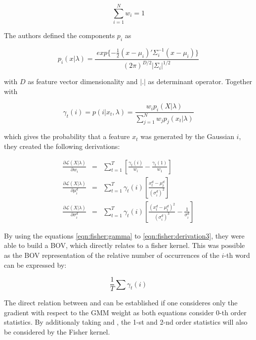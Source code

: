 \begin{equation}
\sum_{i=1}^{N} w_i = 1
\label{eqn:fisher_weights}
\end{equation}

The authors defined the components $p_i$ as

\begin{equation}
p_i(x|\lambda) = \frac{
	\ 	exp \{-\frac{1}{2} (x-\mu_i)' \Sigma_{i}^{-1} (x-\mu_i)\}
}{
	(2 \pi)^{D/2} | \Sigma_i |^{1/2}
}
\end{equation}

with $D$ as feature vector dimensionality and $|.|$ as determinant operator. Together with

\begin{equation}
\gamma_t(i) = p(i|x_t,\lambda) = \frac{w_i p_i(X|\lambda) }{\sum_{j=1}^{N} w_j p_j(x_t|\lambda)}
\label{eqn:fisher:gamma}
\end{equation}

which gives the probability that a feature $x_t$ was generated by the Gaussian $i$, they created the following derivations:

\begin{eqnarray}
\frac{\partial \mathcal{L} (X|\lambda)}{\partial w_i} &=& \sum_{t=1}^{T} \left[ \frac{\gamma_t(i)}{w_i} - \frac{\gamma_t(1)}{w_1} \right]
\label{eqn:fisher:derivation1}\\
\frac{\partial \mathcal{L} (X|\lambda)}{\partial \mu_i^d} &=& \sum_{t=1}^{T} \gamma_t(i) \left[ \frac{x_t^d - \mu_t^d}{(\sigma_i^d)^2} \right]
\label{eqn:fisher:derivation2}\\
\frac{\partial \mathcal{L} (X|\lambda)}{\partial \sigma_i^d} &=& \sum_{t=1}^{T} \gamma_t(i) \left[ \frac{(x_t^d - \mu_t^d)^2}{(\sigma_i^d)^3} - \frac{1}{\sigma_i^d} \right]
\label{eqn:fisher:derivation3}
\end{eqnarray}

By using the equations \ref{eqn:fisher:gamma} to \ref{eqn:fisher:derivation3}, they were able to build a \ac{BOV}, which directly relates to a fisher kernel. This was possible as the \ac{BOV} representation of the relative number of occurrences of the $i$-th word can be expressed by:

\begin{equation}
\frac{1}{T} \sum \gamma_t(i)
\label{eqn:fisher:bov}
\end{equation}

The direct relation between  and  can be established if one consideres only the gradient with respect to the \ac{GMM} weight as both equations consider 0-th order statistics. By additionaly taking  and , the 1-st and 2-nd order statistics will also be considered by the Fisher kernel.


